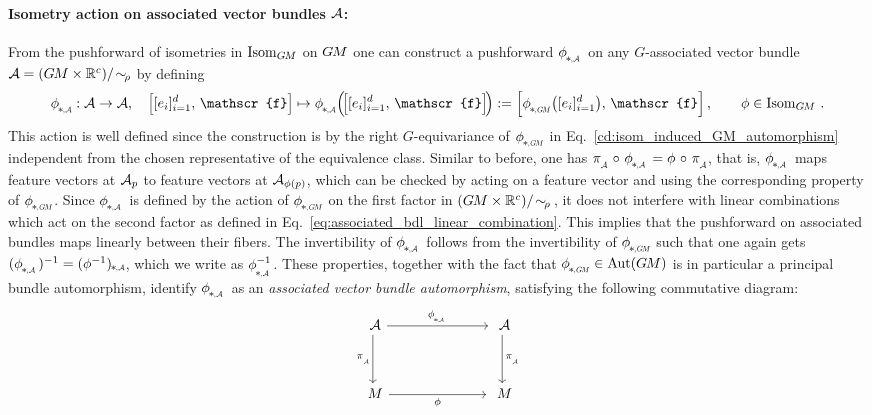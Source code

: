 \paragraph{Isometry action on associated vector bundles $\mathcal{A}$:}
From the pushforward of isometries in $\operatorname{Isom}_{G\mkern-1.4muM}$ on $G\mkern-1.4muM$ one can construct a pushforward $\dphiA$ on any $G$-associated vector bundle $\mathcal{A} = (G\mkern-1.4muM\times\mathbb{R}^c)/\!\sim_{\!\rho}$ by defining
\begin{align}\label{eq:pushforward_A_def}
    \dphiA\!: \A \to \A,\ \ \
    \pig[[e_i]_{i=1}^d,\, \mathscr{f}\pig]
    \mapsto \dphiA\!\Big(\! \pig[[e_i]_{i=1}^d,\, \mathscr{f}\pig] \!\Big)
    := \Big[\dphiGM \big([e_i]_{i=1}^d \big),\, \mathscr{f}\Big] \,,
    \qquad \phi \in \IsomGM \,.
\end{align}
This action is well defined since the construction is by the right $G$-equivariance of $\dphiGM$ in Eq.~\eqref{cd:isom_induced_GM_automorphism} independent from the chosen representative of the equivalence class.
Similar to before, one has $\piA\mkern2mu\circ\mkern2mu \dphiA = \phi\mkern2mu \circ\mkern2mu \piA$, that is, $\dphiA$ maps feature vectors at $\mathcal{A}_p$ to feature vectors at $\mathcal{A}_{\phi(p)}$, which can be checked by acting on a feature vector and using the corresponding property of $\dphiGM$.
Since $\dphiA$ is defined by the action of $\dphiGM$ on the first factor in $(G\mkern-1.4muM\times\mathbb{R}^c)/\!\sim_{\!\rho}$\,, it does not interfere with linear combinations which act on the second factor as defined in Eq.~\eqref{eq:associated_bdl_linear_combination}.
This implies that the pushforward on associated bundles maps linearly between their fibers.
The invertibility of $\dphiA$ follows from the invertibility of $\dphiGM$ such that one again gets $(\dphiA)^{-1} = (\phi^{-1})_{\mkern-2mu*\mkern-1mu\scalebox{.55}{$,\mkern-2mu \A$}}$, which we write as $\dphiAinv$.
These properties, together with the fact that $\dphiGM \in \Aut(\GM)$ is in particular a principal bundle automorphism, identify $\dphiA$ as an \emph{associated vector bundle automorphism}, satisfying the following commutative diagram:
\begin{equation}\label{cd:associated_bdl_automorphism}
\begin{tikzcd}[column sep=70pt, row sep=35, font=\normalsize]
    \A
        \arrow[r, "\dphiA"]
        \arrow[d, "\piA"']
    &
    \A
        \arrow[d, "\piA"]
    \\
    M
        \arrow[r, "\phi"']
    &
    M
\end{tikzcd}
\end{equation}


